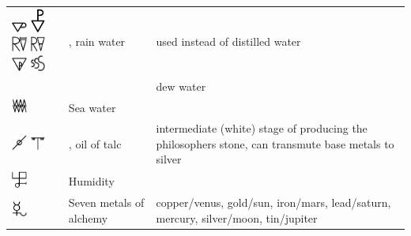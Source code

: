 \documentclass[british,final,landscape]{scrartcl}
\begin{document}
\begin{refsection}
\begin{supertabular}{p{0.3\textwidth}p{0.34\textwidth}p{0.34\textwidth}}
  \includegraphics[width=5mm]{Concepts/AquaPluvialis} \includegraphics[width=5mm]{Concepts/AquaPluvialis2} \includegraphics[width=5mm]{Concepts/AquaPluvialis3} \includegraphics[width=5mm]{Concepts/AquaPluvialis4} \includegraphics[width=5mm]{Concepts/AquaPluvialis5} \includegraphics[width=5mm]{Concepts/AquaPluvialis6} & , rain water & used instead of distilled water \\
   &  & dew water \\
  \includegraphics[width=5mm]{Concepts/WaterSea} & Sea water & \\
  \includegraphics[width=5mm]{Concepts/OilOfTalc} \includegraphics[width=5mm]{Concepts/OilOfTalc2} & , oil of talc & intermediate (white) stage of producing the philosophers stone, can transmute base metals to silver \\
  \includegraphics[width=5mm]{Concepts/Humidity} & Humidity & \\
  \includegraphics[width=5mm]{Concepts/SevenMetals} & Seven metals of alchemy & copper/venus, gold/sun, iron/mars, lead/saturn, mercury, silver/moon, tin/jupiter \\

\end{supertabular}
\end{refsection}
\end{document}

